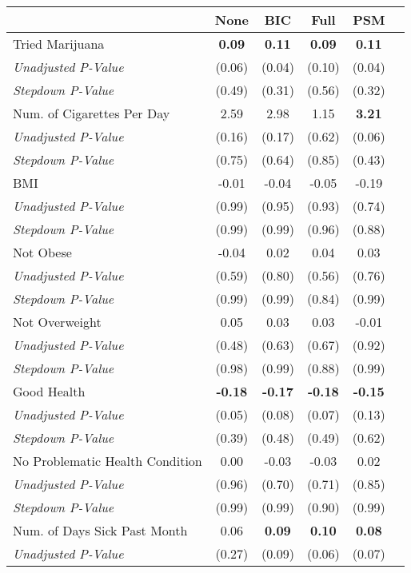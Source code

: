\begin{tabular}{l c c c c c}
\toprule
 & None & BIC & Full & PSM \\
\midrule
Tried Marijuana & \textbf{ 0.09 } & \textbf{ 0.11 } & \textbf{ 0.09 } & \textbf{ 0.11 } \\
\quad \textit{Unadjusted P-Value} & (0.06) & (0.04) & (0.10) & (0.04) \\
\quad \textit{Stepdown P-Value} & (0.49) & (0.31) & (0.56) & (0.32) \\
Num. of Cigarettes Per Day & 2.59 & 2.98 & 1.15 & \textbf{ 3.21 } \\
\quad \textit{Unadjusted P-Value} & (0.16) & (0.17) & (0.62) & (0.06) \\
\quad \textit{Stepdown P-Value} & (0.75) & (0.64) & (0.85) & (0.43) \\
BMI & -0.01 & -0.04 & -0.05 & -0.19 \\
\quad \textit{Unadjusted P-Value} & (0.99) & (0.95) & (0.93) & (0.74) \\
\quad \textit{Stepdown P-Value} & (0.99) & (0.99) & (0.96) & (0.88) \\
Not Obese & -0.04 & 0.02 & 0.04 & 0.03 \\
\quad \textit{Unadjusted P-Value} & (0.59) & (0.80) & (0.56) & (0.76) \\
\quad \textit{Stepdown P-Value} & (0.99) & (0.99) & (0.84) & (0.99) \\
Not Overweight & 0.05 & 0.03 & 0.03 & -0.01 \\
\quad \textit{Unadjusted P-Value} & (0.48) & (0.63) & (0.67) & (0.92) \\
\quad \textit{Stepdown P-Value} & (0.98) & (0.99) & (0.88) & (0.99) \\
Good Health & \textbf{ -0.18 } & \textbf{ -0.17 } & \textbf{ -0.18 } & \textbf{ -0.15 } \\
\quad \textit{Unadjusted P-Value} & (0.05) & (0.08) & (0.07) & (0.13) \\
\quad \textit{Stepdown P-Value} & (0.39) & (0.48) & (0.49) & (0.62) \\
No Problematic Health Condition & 0.00 & -0.03 & -0.03 & 0.02 \\
\quad \textit{Unadjusted P-Value} & (0.96) & (0.70) & (0.71) & (0.85) \\
\quad \textit{Stepdown P-Value} & (0.99) & (0.99) & (0.90) & (0.99) \\
Num. of Days Sick Past Month & 0.06 & \textbf{ 0.09 } & \textbf{ 0.10 } & \textbf{ 0.08 } \\
\quad \textit{Unadjusted P-Value} & (0.27) & (0.09) & (0.06) & (0.07) \\

\end{tabular}
